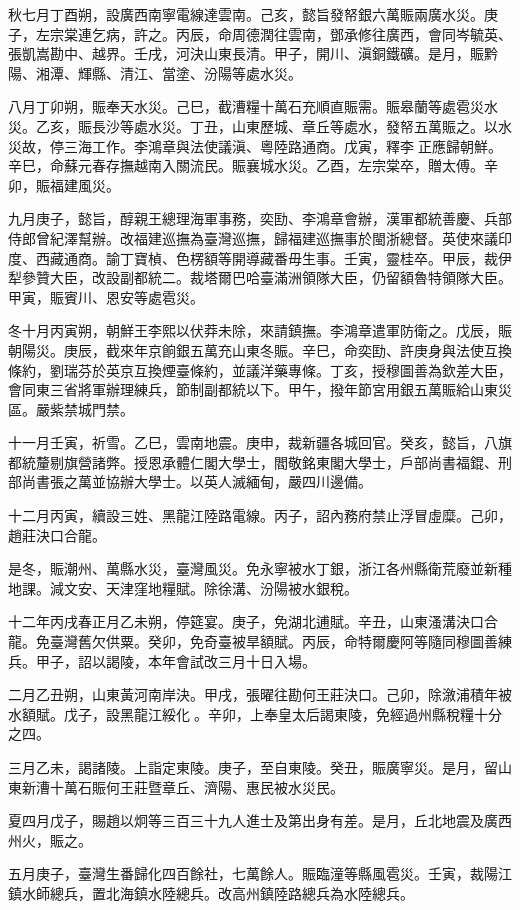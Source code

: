 \begin{pinyinscope}
秋七月丁酉朔，設廣西南寧電線達雲南。己亥，懿旨發帑銀六萬賑兩廣水災。庚子，左宗棠連乞病，許之。丙辰，命周德潤往雲南，鄧承修往廣西，會同岑毓英、張凱嵩勘中、越界。壬戌，河決山東長清。甲子，開川、滇銅鐵礦。是月，賑黔陽、湘潭、輝縣、清江、當塗、汾陽等處水災。

八月丁卯朔，賑奉天水災。己巳，截漕糧十萬石充順直賑需。賑皋蘭等處雹災水災。乙亥，賑長沙等處水災。丁丑，山東歷城、章丘等處水，發帑五萬賑之。以水災故，停三海工作。李鴻章與法使議滇、粵陸路通商。戊寅，釋李正應歸朝鮮。辛巳，命蘇元春存撫越南入關流民。賑襄城水災。乙酉，左宗棠卒，贈太傅。辛卯，賑福建風災。

九月庚子，懿旨，醇親王總理海軍事務，奕劻、李鴻章會辦，漢軍都統善慶、兵部侍郎曾紀澤幫辦。改福建巡撫為臺灣巡撫，歸福建巡撫事於閩浙總督。英使來議印度、西藏通商。諭丁寶楨、色楞額等開導藏番毋生事。壬寅，靈桂卒。甲辰，裁伊犁參贊大臣，改設副都統二。裁塔爾巴哈臺滿洲領隊大臣，仍留額魯特領隊大臣。甲寅，賑賓川、恩安等處雹災。

冬十月丙寅朔，朝鮮王李熙以伏莽未除，來請鎮撫。李鴻章遣軍防衛之。戊辰，賑朝陽災。庚辰，截來年京餉銀五萬充山東冬賑。辛巳，命奕劻、許庚身與法使互換條約，劉瑞芬於英京互換煙臺條約，並議洋藥專條。丁亥，授穆圖善為欽差大臣，會同東三省將軍辦理練兵，節制副都統以下。甲午，撥年節宮用銀五萬賑給山東災區。嚴紫禁城門禁。

十一月壬寅，祈雪。乙巳，雲南地震。庚申，裁新疆各城回官。癸亥，懿旨，八旗都統釐剔旗營諸弊。授恩承體仁閣大學士，閻敬銘東閣大學士，戶部尚書福錕、刑部尚書張之萬並協辦大學士。以英人滅緬甸，嚴四川邊備。

十二月丙寅，續設三姓、黑龍江陸路電線。丙子，詔內務府禁止浮冒虛糜。己卯，趙莊決口合龍。

是冬，賑潮州、萬縣水災，臺灣風災。免永寧被水丁銀，浙江各州縣衛荒廢並新種地課。減文安、天津窪地糧賦。除徐溝、汾陽被水銀稅。

十二年丙戌春正月乙未朔，停筵宴。庚子，免湖北逋賦。辛丑，山東溞溝決口合龍。免臺灣舊欠供粟。癸卯，免奇臺被旱額賦。丙辰，命特爾慶阿等隨同穆圖善練兵。甲子，詔以謁陵，本年會試改三月十日入場。

二月乙丑朔，山東黃河南岸決。甲戌，張曜往勘何王莊決口。己卯，除漵浦積年被水額賦。戊子，設黑龍江綏化。辛卯，上奉皇太后謁東陵，免經過州縣稅糧十分之四。

三月乙未，謁諸陵。上詣定東陵。庚子，至自東陵。癸丑，賑廣寧災。是月，留山東新漕十萬石賑何王莊暨章丘、濟陽、惠民被水災民。

夏四月戊子，賜趙以炯等三百三十九人進士及第出身有差。是月，丘北地震及廣西州火，賑之。

五月庚子，臺灣生番歸化四百餘社，七萬餘人。賑臨潼等縣風雹災。壬寅，裁陽江鎮水師總兵，置北海鎮水陸總兵。改高州鎮陸路總兵為水陸總兵。


\end{pinyinscope}
